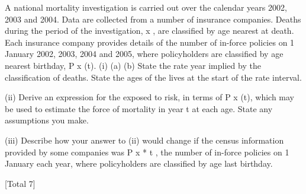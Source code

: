 \documentclass[a4paper,12pt]{article}
\begin{document}

A national mortality investigation is carried out over the calendar years 2002, 2003
and 2004. Data are collected from a number of insurance companies.
Deaths during the period of the investigation,
x ,
are classified by age nearest at death.
Each insurance company provides details of the number of in-force policies on
1 January 2002, 2003, 2004 and 2005, where policyholders are classified by age
nearest birthday, P x (t).
(i)
(a)
(b)
State the rate year implied by the classification of deaths.
State the ages of the lives at the start of the rate interval.

(ii) Derive an expression for the exposed to risk, in terms of P x (t), which may be
used to estimate the force of mortality in year t at each age. State any
assumptions you make.

(iii) Describe how your answer to (ii) would change if the census information
provided by some companies was P x * t , the number of in-force policies on
1 January each year, where policyholders are classified by age last birthday.

[Total 7]
\end{document}
